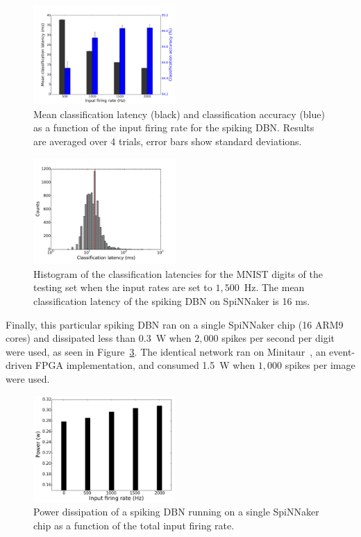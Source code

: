 \documentclass{frontiersENG} %
\begin{document}
\begin{figure}[hbt!]
	\centering
	\includegraphics[width=0.48\textwidth]{latencyCAfiringrate}
	\caption{Mean classification latency (black) and classification accuracy (blue) as a function of the input firing rate for the spiking DBN. Results are averaged over 4 trials, error bars show standard deviations.}
	\label{Fig:brianLatency}
\end{figure} 



\begin{figure}[hbt!]
	\centering
	\includegraphics[width=0.48\textwidth]{classlatencyIJCNN1500hz}
	\caption{Histogram of the classification latencies for the MNIST digits of the testing set when the input rates are set to $1,500$~Hz. The mean classification latency of the spiking DBN on SpiNNaker is 16 ms.}
	\label{Fig:spinnLatency1500hz}
\end{figure} 

Finally, this particular spiking DBN ran on a single SpiNNaker chip (16 ARM9 cores) and dissipated less than 0.3~W when $2,000$ spikes per second per digit were used, as seen in Figure~\ref{Fig:spinnchipPower}. The identical network ran on Minitaur~\citep{neil2014minitaur}, an event-driven FPGA implementation, and consumed 1.5~W when $1,000$ spikes per image were used.  


\begin{figure}[hbt!]
	\centering
	\includegraphics[width=0.48\textwidth]{powerspinnaker}
	\caption{Power dissipation of a spiking DBN running on a single SpiNNaker chip as a function of the total input firing rate.}
	\label{Fig:spinnchipPower}
\end{figure} 
\end{document}
